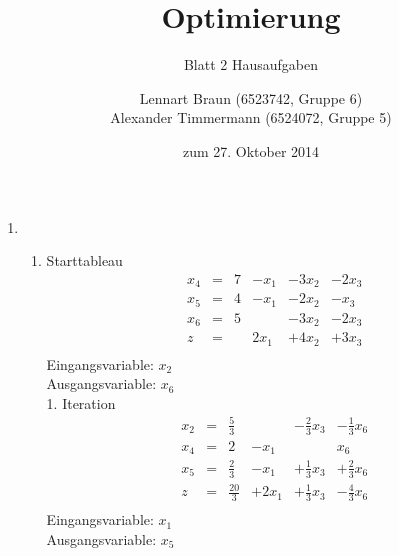 \documentclass[a4paper]{scrartcl}
\title{Optimierung}
\subtitle{Blatt 2 Hausaufgaben}
\author{
	Lennart Braun (6523742, Gruppe 6) \\
    Alexander Timmermann (6524072, Gruppe 5)
}
\date{zum 27. Oktober 2014}
\begin{document}
\maketitle

\begin{enumerate}
    \item %
        \begin{enumerate}
            \item
                Starttableau
                \begin{equation}
                    \begin{array}{rcrrrr}
                        x_4 & = & 7 & -x_1 & -3x_2 & -2x_3 \\
                        x_5 & = & 4 & -x_1 & -2x_2 &  -x_3 \\
                        x_6 & = & 5 &      & -3x_2 & -2x_3 \\
                        \hline
                        z   & = &   & 2x_1 & +4x_2 & +3x_3 \\
                    \end{array}
                \end{equation}
                Eingangsvariable: $x_2$ \\
                Ausgangsvariable: $x_6$ \\

                1. Iteration
                \begin{equation}
                    \begin{array}{rcrrrr}
                        x_2 & = & \frac{5}{3} & & -\frac{2}{3}x_3 & -\frac{1}{3}x_6 \\
                        x_4 & = & 2 & -x_1 & & x_6 \\
                        x_5 & = & \frac{2}{3} & -x_1 & +\frac{1}{3}x_3 & +\frac{2}{3}x_6 \\
                        \hline
                        z   & = & \frac{20}{3} & +2x_1 & +\frac{1}{3}x_3 & -\frac{4}{3}x_6 \\
                    \end{array}
                \end{equation}
                Eingangsvariable: $x_1$ \\
                Ausgangsvariable: $x_5$


\end{enumerate}
\end{enumerate}
\end{document}
